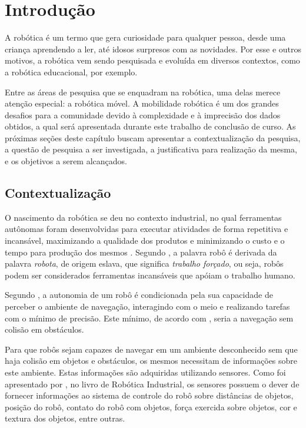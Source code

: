 \chapter[Introdução]{Introdução}

	A robótica é um termo que gera curiosidade para qualquer pessoa, desde uma criança aprendendo a ler, até idosos surpresos com as novidades. Por esse e outros motivos, a robótica vem sendo pesquisada e evoluída em diversos contextos, como a robótica educacional, por exemplo.

	Entre as áreas de pesquisa que se enquadram na robótica, uma delas merece atenção especial: a robótica móvel. A mobilidade robótica é um dos grandes desafios para a comunidade devido à complexidade e à imprecisão dos dados obtidos, a qual será apresentada durante este trabalho de conclusão de curso. As próximas seções deste capítulo buscam apresentar a contextualização da pesquisa, a questão de pesquisa a ser investigada, a justificativa para realização da mesma, e os objetivos a serem alcançados.

\section{Contextualização}

	O nascimento da robótica se deu no contexto industrial, no qual ferramentas autônomas foram desenvolvidas para executar atividades de forma repetitiva e incansável, maximizando a qualidade dos produtos e minimizando o custo e o tempo para produção dos mesmos \cite{roboticaIndustrial}. Segundo \cite{roboticaIndustrial}, a palavra robô é derivada da palavra \textit{robota}, de origem eslava, que significa \textit{trabalho forçado}, ou seja, robôs podem ser considerados ferramentas incansáveis que apóiam o trabalho humano.

	Segundo \cite{localizacaoEMapeamentoPaulo}, a autonomia de um robô é condicionada pela sua capacidade de perceber o ambiente de navegação, interagindo com o meio e realizando tarefas com o mínimo de precisão. Este mínimo, de acordo com \cite{localizacaoEMapeamentoPaulo}, seria a navegação sem colisão em obstáculos.

	Para que robôs sejam capazes de navegar em um ambiente desconhecido sem que haja colisão em objetos e obstáculos, os mesmos necessitam de informações sobre este ambiente. Estas informações são adquiridas utilizando sensores. Como foi apresentado por \cite{interacaoRoboAmbiente}, no livro de Robótica Industrial, os sensores possuem o dever de fornecer informações ao sistema de controle do robô sobre distâncias de objetos, posição do robô, contato do robô com objetos, força exercida sobre objetos, cor e textura dos objetos, entre outras.

